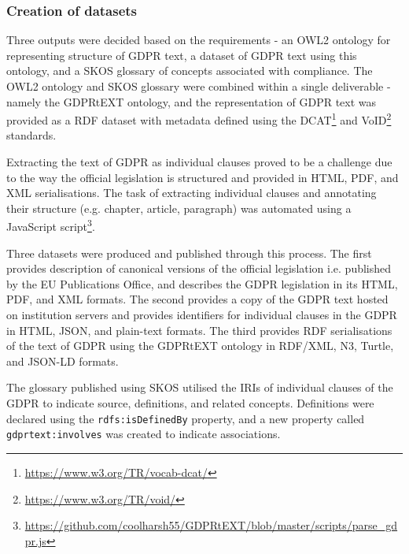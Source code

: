 \subsubsection{Creation of datasets}
Three outputs were decided based on the requirements - an OWL2 ontology for representing structure of GDPR text, a dataset of GDPR text using this ontology, and a SKOS glossary of concepts associated with compliance. The OWL2 ontology and SKOS glossary were combined within a single deliverable - namely the GDPRtEXT ontology, and the representation of GDPR text was provided as a RDF dataset with metadata defined using the DCAT\footnote{\url{https://www.w3.org/TR/vocab-dcat/}} and VoID\footnote{\url{https://www.w3.org/TR/void/}} standards.

Extracting the text of GDPR as individual clauses proved to be a challenge due to the way the official legislation is structured and provided in HTML, PDF, and XML serialisations. The task of extracting individual clauses and annotating their structure (e.g. chapter, article, paragraph) was automated using a JavaScript script\footnote{\url{https://github.com/coolharsh55/GDPRtEXT/blob/master/scripts/parse_gdpr.js}}.

Three datasets were produced and published through this process. The first provides description of canonical versions of the official legislation i.e. published by the EU Publications Office, and describes the GDPR legislation in its HTML, PDF, and XML formats. The second provides a copy of the GDPR text hosted on institution servers and provides identifiers for individual clauses in the GDPR in HTML, JSON, and plain-text formats. The third provides RDF serialisations of the text of GDPR using the GDPRtEXT ontology in RDF/XML, N3, Turtle, and JSON-LD formats.

The glossary published using SKOS utilised the IRIs of individual clauses of the GDPR to indicate source, definitions, and related concepts. Definitions were declared using the \texttt{rdfs:isDefinedBy} property, and a new property called \texttt{gdprtext:involves} was created to indicate associations. 

